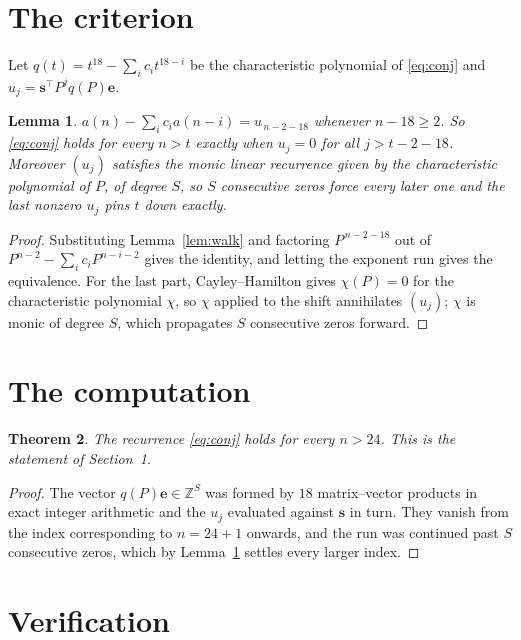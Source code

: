 \documentclass[11pt,a4paper]{article}
\theoremstyle{plain}
\newtheorem{theorem}{Theorem}
\newtheorem{lemma}[theorem]{Lemma}
\theoremstyle{definition}
\begin{document}
\section{The criterion}

Let $q(t)=t^{18}-\sum_i c_i t^{18-i}$ be the characteristic polynomial of
\eqref{eq:conj} and $u_j=\mathbf{s}^{\!\top}P^{j}q(P)\mathbf{e}$.

\begin{lemma}\label{lem:crit}
$a(n)-\sum_i c_i a(n-i)=u_{\,n-2-18}$ whenever $n-18\ge2$. So \eqref{eq:conj}
holds for every $n>t$ exactly when $u_j=0$ for all $j>t-2-18$. Moreover $(u_j)$
satisfies the monic linear recurrence given by the characteristic polynomial of $P$, of
degree $S$, so $S$ consecutive zeros force every later one and the last nonzero $u_j$ pins
$t$ down exactly.
\end{lemma}

\begin{proof}
Substituting Lemma~\ref{lem:walk} and factoring $P^{\,n-2-18}$ out of
$P^{n-2}-\sum_i c_i P^{n-i-2}$ gives the identity, and letting the exponent run gives the
equivalence. For the last part, Cayley--Hamilton gives $\chi(P)=0$ for the characteristic
polynomial $\chi$, so $\chi$ applied to the shift annihilates $(u_j)$; $\chi$ is monic of
degree $S$, which propagates $S$ consecutive zeros forward.
\end{proof}

\section{The computation}

\begin{theorem}
The recurrence \eqref{eq:conj} holds for every $n>24$. This is the statement of
Section~1.
\end{theorem}

\begin{proof}
The vector $q(P)\mathbf{e}\in\mathbb{Z}^{S}$ was formed by $18$ matrix--vector
products in exact integer arithmetic and the $u_j$ evaluated against $\mathbf{s}$ in turn.
They vanish from the index corresponding to $n=24+1$ onwards, and the run was continued
past $S$ consecutive zeros, which by Lemma~\ref{lem:crit} settles every larger index.
\end{proof}

\section{Verification}
\end{document}
